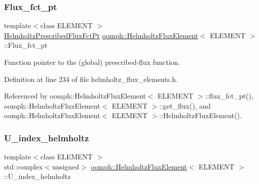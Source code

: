 \mbox{\label{classoomph_1_1HelmholtzFluxElement_a28e520786dcd619f8e362356f9492728}} 
\subsubsection{\texorpdfstring{Flux\+\_\+fct\+\_\+pt}{Flux\_fct\_pt}}
{\footnotesize\ttfamily template$<$class E\+L\+E\+M\+E\+NT $>$ \\
\hyperlink{classoomph_1_1HelmholtzFluxElement_ad53ce405c551a39ac9baeaaab7f254df}{Helmholtz\+Prescribed\+Flux\+Fct\+Pt} \hyperlink{classoomph_1_1HelmholtzFluxElement}{oomph\+::\+Helmholtz\+Flux\+Element}$<$ E\+L\+E\+M\+E\+NT $>$\+::Flux\+\_\+fct\+\_\+pt\hspace{0.3cm}{\ttfamily [protected]}}



Function pointer to the (global) prescribed-\/flux function. 



Definition at line 234 of file helmholtz\+\_\+flux\+\_\+elements.\+h.



Referenced by oomph\+::\+Helmholtz\+Flux\+Element$<$ E\+L\+E\+M\+E\+N\+T $>$\+::flux\+\_\+fct\+\_\+pt(), oomph\+::\+Helmholtz\+Flux\+Element$<$ E\+L\+E\+M\+E\+N\+T $>$\+::get\+\_\+flux(), and oomph\+::\+Helmholtz\+Flux\+Element$<$ E\+L\+E\+M\+E\+N\+T $>$\+::\+Helmholtz\+Flux\+Element().

\mbox{\label{classoomph_1_1HelmholtzFluxElement_ac5fd419a34614c3ae7a784faa28b773e}} 
\subsubsection{\texorpdfstring{U\+\_\+index\+\_\+helmholtz}{U\_index\_helmholtz}}
{\footnotesize\ttfamily template$<$class E\+L\+E\+M\+E\+NT $>$ \\
std\+::complex$<$unsigned$>$ \hyperlink{classoomph_1_1HelmholtzFluxElement}{oomph\+::\+Helmholtz\+Flux\+Element}$<$ E\+L\+E\+M\+E\+NT $>$\+::U\+\_\+index\+\_\+helmholtz\hspace{0.3cm}{\ttfamily [protected]}}



